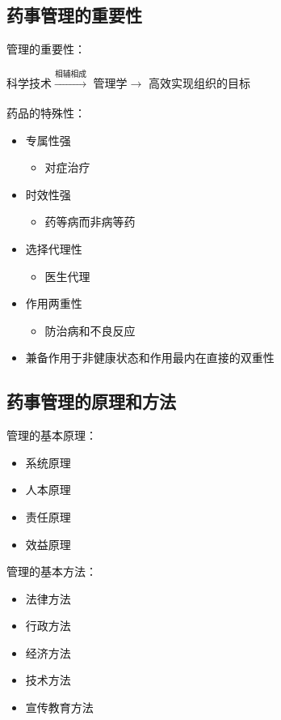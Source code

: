 \subsection{药事管理的重要性}%
\label{sub:药事管理的重要性}
\begin{notation}
    管理的重要性：

    科学技术$\xrightarrow[]{\text{相辅相成}} $ 管理学$\to $ 高效实现组织的目标
\end{notation}
药品的特殊性：
\begin{itemize}
    \item 专属性强
        \begin{itemize}
            \item 对症治疗
        \end{itemize}
    \item 时效性强
        \begin{itemize}
            \item 药等病而非病等药
        \end{itemize}
    \item 选择代理性
        \begin{itemize}
            \item 医生代理 
        \end{itemize}
    \item 作用两重性
        \begin{itemize}
            \item 防治病和不良反应
        \end{itemize}
    \item 兼备作用于非健康状态和作用最内在直接的双重性
\end{itemize}
\subsection{药事管理的原理和方法}%
\label{sub:药事管理的原理和方法}
\begin{notation}
    管理的基本原理：
    \begin{itemize}
        \item 系统原理
        \item 人本原理
        \item 责任原理
        \item 效益原理
    \end{itemize}
\end{notation}
\begin{notation}
    管理的基本方法：
    \begin{itemize}
    \item 法律方法
    \item 行政方法
    \item 经济方法
    \item 技术方法
    \item 宣传教育方法
    \end{itemize}
\end{notation}
